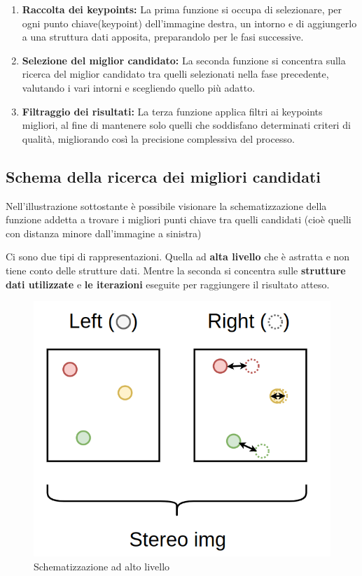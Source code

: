 \documentclass[12pt,a4paper]{report}
\begin{document}
\begin{enumerate}
    \item \textbf{Raccolta dei keypoints:} La prima funzione si occupa di selezionare, per ogni punto chiave(keypoint) dell'immagine destra, un intorno e di aggiungerlo a una struttura dati apposita, preparandolo per le fasi successive.
    \item \textbf{Selezione del miglior candidato:} La seconda funzione si concentra sulla ricerca del miglior candidato tra quelli selezionati nella fase precedente, valutando i vari intorni e scegliendo quello più adatto.
    \item \textbf{Filtraggio dei risultati:} La terza funzione applica filtri ai keypoints migliori, al fine di mantenere solo quelli che soddisfano determinati criteri di qualità, migliorando così la precisione complessiva del processo.
\end{enumerate}

\newpage
\subsection{Schema della ricerca dei migliori candidati}

Nell'illustrazione sottostante è possibile visionare la schematizzazione della funzione addetta a trovare i migliori punti chiave tra quelli candidati (cioè quelli con distanza minore dall'immagine a sinistra)

Ci sono due tipi di rappresentazioni. Quella ad \textbf{alta livello} che è astratta e non tiene conto delle strutture dati. Mentre la seconda si concentra sulle \textbf{strutture dati utilizzate} e \textbf{le iterazioni} eseguite per raggiungere il risultato atteso.

\begin{figure}[h]
    \centering
    \includegraphics[width=0.5\linewidth]{img/find_distance_high_scheme.png}
    \caption{Schematizzazione ad alto livello }
\end{figure}
\end{document}
